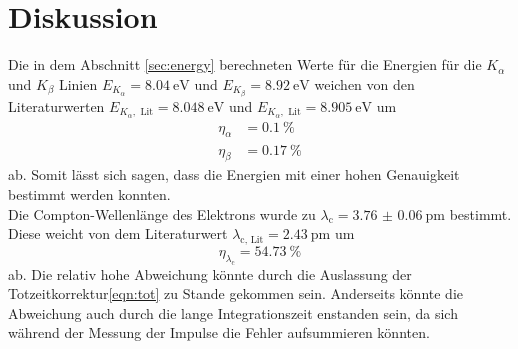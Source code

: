 \section{Diskussion}
\label{sec:Diskussion}
Die in dem Abschnitt \ref{sec:energy} berechneten Werte für die Energien für die $K_\alpha$ und $K_\beta$ Linien
$E_{K_\alpha} = \SI{8.04}{\electronvolt}$ und $E_{K_\beta} = \SI{8.92}{\electronvolt}$ weichen von den Literaturwerten
$E_{K_\alpha, \text{ Lit}} = \SI{8.048}{\electronvolt}$\cite{litlinien} und $E_{K_\alpha, \text{ Lit}} = \SI{8.905}{\electronvolt}$\cite{litlinien} um
\begin{align*}
    \eta_\alpha &= \SI{0.1}{\percent} \\
    \eta_\beta  &= \SI{0.17}{\percent}
\end{align*}
ab. 
Somit lässt sich sagen, dass die Energien mit einer hohen Genauigkeit bestimmt werden konnten.\\
Die Compton-Wellenlänge des Elektrons wurde zu $\lambda_\text{c} = \SI{3.76(6)}{\pico\metre}$ bestimmt. 
Diese weicht von dem Literaturwert $\lambda_\text{c, Lit} = \SI{2.43}{\pico\metre}$\cite{compton} um 
\begin{equation*}
    \eta_{\lambda_\text{c}} = \SI{54.73}{\percent}
\end{equation*}
ab.  
Die relativ hohe Abweichung könnte durch die Auslassung der Totzeitkorrektur\eqref{eqn:tot} zu Stande gekommen sein.
Anderseits könnte die Abweichung auch durch die lange Integrationszeit enstanden sein, da sich während der Messung der Impulse 
die Fehler aufsummieren könnten.